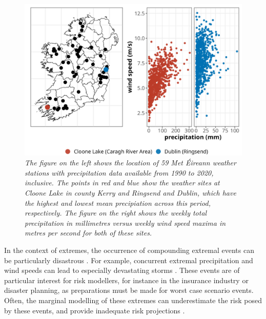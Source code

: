 \documentclass{article}
\numberwithin{equation}{section}
\begin{document}
\begin{figure}[H]
    \centering
    \includegraphics[width = 0.9\linewidth]{plots/02_mot_ex_plot_crop.png}
    \caption{\emph{The figure on the left shows the location of 59 Met Éireann weather stations with precipitation data available from 1990 to 2020, inclusive. The points in red and blue show the weather sites at Cloone Lake in county Kerry and Ringsend and Dublin, which have the highest and lowest mean precipiation across this period, respectively. The figure on the right shows the weekly total precipitation in millimetres versus weekly wind speed maxima in metres per second for both of these sites.}}
    \label{fig:02_locs}
\end{figure}

In the context of extremes, the occurrence of compounding extremal events can be particularly disastrous \citep{Vignotto2021, Leonard2014}.
For example, concurrent extremal precipitation and wind speeds can lead to especially devastating storms \citep{Martius2016}.
These events are of particular interest for risk modellers, for instance in the insurance industry or disaster planning, as preparations must be made for worst case scenario events.
Often, the marginal modelling of these extremes can underestimate the risk posed by these events, and provide inadequate risk projections \citep{Zscheischler2017}.
\end{document}
